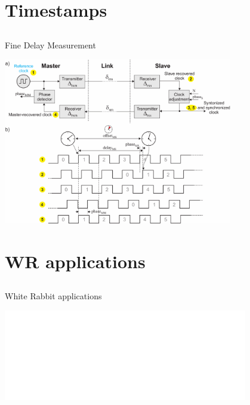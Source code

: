 \documentclass[compress,red]{beamer}
\begin{document}
\section{Timestamps}
\subsection{}
\begin{frame}{Fine Delay Measurement}

  \begin{center}
  \includegraphics[width=10.0cm]{protocol/link_model.pdf}
  \end{center}

\end{frame}
\section{WR applications}
\subsection{}
\begin{frame}{White Rabbit applications}
\begin{center}
   \includegraphics<1>[width=0.80\textwidth]{applications/OperaTiming2.pdf}
     \end{center}  

\end{frame}

\end{document}
